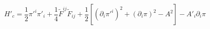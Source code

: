 \begin{equation}
  H'_c=\frac{1}{2}\pi'^{i} \pi'
  _{i}+\frac{1}{4}\tilde{F}^{ij} \tilde{F}_{ij}+\frac{1}{2}\left[(\partial_i
  \pi'^i)^2+(\partial_i \pi)^2 -A^2\right]-A'_i \partial_i\pi
  \label{b44}
  \end{equation}

